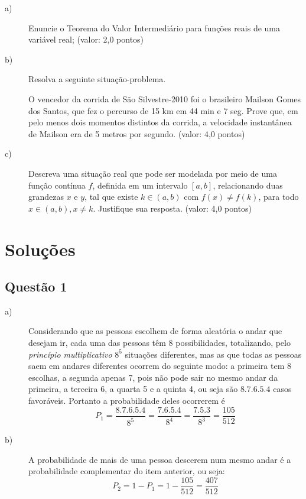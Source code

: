 \documentclass[12pt]{article}
\begin{document}
\begin{description}

\item[a)] Enuncie o Teorema do Valor Intermediário para funções reais de uma variável real; (valor: 2,0 pontos)

\item[b)] Resolva a seguinte situação-problema.

O vencedor da corrida de São Silvestre-2010 foi o brasileiro Mailson Gomes dos Santos, que fez o percurso de 15 km em 44 min e 7 seg. Prove que, em pelo menos dois momentos distintos da corrida, a velocidade instantânea de Mailson era de 5 metros por segundo. (valor: 4,0 pontos)

\item[c)] Descreva uma situação real que pode ser modelada por meio de uma função contínua $f$, definida em um intervalo $[a , b]$, relacionando duas grandezas $x$ e $y$, tal que existe $k\in (a , b)$ com $f(x) \neq f(k)$, para todo $x\in (a , b), x \neq k$. Justifique sua resposta. (valor: 4,0 pontos)

\end{description}

\section*{\color{red} Soluções}

\subsection*{\color{red} Questão 1}

\begin{description}

\item[a)] Considerando que as pessoas escolhem de forma aleatória o andar que desejam ir, cada uma das pessoas têm 8 possibilidades, totalizando, pelo \emph{princípio multiplicativo} $8^5$ situações diferentes, mas as que todas as pessoas saem em andares diferentes ocorrem do seguinte modo: a primeira tem 8 escolhas, a segunda apenas 7, pois não pode sair no mesmo andar da primeira, a terceira 6, a quarta 5 e a quinta 4, ou seja são $8.7.6.5.4$ casos favoráveis. Portanto a probabilidade deles ocorrerem é $$P_1= \frac{8.7.6.5.4}{8^5}=\frac{7.6.5.4}{8^4}=\frac{7.5.3}{8^3}=\frac{105}{512}$$

\item[b)] A probabilidade de mais de uma pessoa descerem num mesmo andar é a probabilidade complementar do item anterior, ou seja: $$P_2=1-P_1=1-\frac{105}{512}=\frac{407}{512}$$

\end{description}
\end{document}
